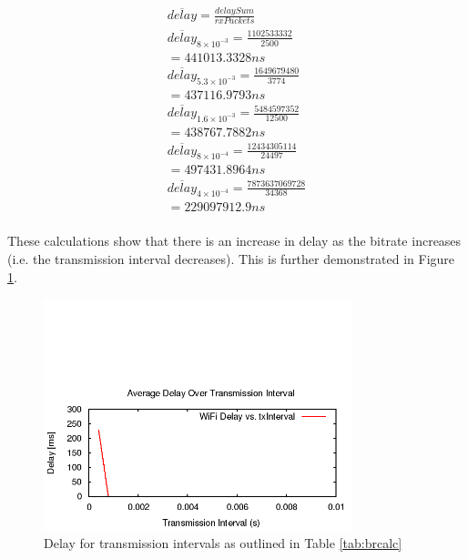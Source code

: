 \begin{gather*}
	\overline{delay}=\frac{delaySum}{rxPackets} \\
\overline{delay}_{8\times10^{-3}}=\frac{1102533332}{2500} \\
	= 441013.3328ns \\
	\overline{delay}_{5.3\times10^{-3}}=\frac{1649679480}{3774} \\
	= 437116.9793ns \\
	\overline{delay}_{1.6\times10^{-3}}=\frac{5484597352}{12500} \\
	= 438767.7882ns \\
	\overline{delay}_{8\times10^{-4}}=\frac{12434305114}{24497} \\
	= 497431.8964ns \\
	\overline{delay}_{4\times10^{-4}}=\frac{7873637069728}{34368} \\
	= 229097912.9ns \\
\end{gather*}

\par These calculations show that there is an increase in delay as the bitrate
increases (i.e. the transmission interval decreases). This is further
demonstrated in Figure \ref{fig:QAP2Delay}.

\begin{figure}[H]
	\centering
	\includegraphics[width=0.8\textwidth]{images/EE500/QA/P2/Images/wifi-delay}
	\caption{Delay for transmission intervals as outlined in Table
	\ref{tab:brcalc}}
	\label{fig:QAP2Delay}
\end{figure}

